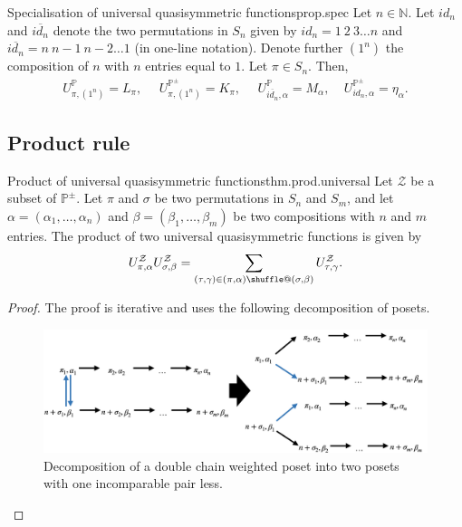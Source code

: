 \documentclass[numbers=enddot,12pt,final,onecolumn,notitlepage]{scrartcl}%
\makeatletter
\newcommand{\al}{\alpha}
\newcommand{\be}{\beta}
\newcommand{\NN}{\mathbb{N}} %
\newcommand{\PP}{\mathbb{P}} %
\providecommand*{\shuffle}{%
  \mathbin{\mathpalette\shuffle@{}}%
}
\newcommand*{\shuffle@}[2]{%
  \sbox0{$#1\vcenter{}$}%
  \kern .15\ht0 %
  \rlap{\vrule height .25\ht0 depth 0pt width 2.5\ht0}%
  \raise.1\ht0\hbox to 2.5\ht0{%
    \vrule height 1.75\ht0 depth -.1\ht0 width .17\ht0 %
    \hfill
    \vrule height 1.75\ht0 depth -.1\ht0 width .17\ht0 %
    \hfill
    \vrule height 1.75\ht0 depth -.1\ht0 width .17\ht0 %
  }%
  \kern .15\ht0 %
}
\newcommand{\0}{\phantom{c}}
\let\sumnonlimits\sum
\renewcommand{\sum}{\sumnonlimits\limits}
\makeatother
\begin{document}
\begin{proposition}{Specialisation of universal quasisymmetric functions}{prop.spec}
\indent Let $n \in \NN$. Let $id_{n}$ and $\overline{id_{n}}$ denote the two permutations in $S_n$ given by $id_{n} = 1~2~3\dots n$ and $\overline{id_{n}} = n~n-1~n-2\dots 1$ (in one-line notation). Denote further $(1^n)$ the composition of $n$ with $n$ entries equal to $1$. Let $\pi \in S_n$. Then,
\begin{align}
\label{eq : UE} U^\mathcal{\PP}_{\pi,(1^n)} = L_\pi, ~~~~~~U^\mathcal{\PP^\pm}_{\pi,(1^n)} = K_\pi, ~~~~~~U^{\mathcal{\PP}}_{\overline{id_{n}},\alpha} = M_{\alpha},
~~~~~U^{\mathcal{\PP^\pm}}_{id_{n},\alpha} = \eta_{\alpha}.
\end{align}

\end{proposition}

\subsection{Product rule}
\begin{theorem}{Product of universal quasisymmetric functions}{thm.prod.universal}
Let $\mathcal{Z}$ be a subset of $\PP^{\pm}$.
Let $\pi$ and $\sigma$ be two permutations in $S_n$ and $S_m$, and let $\alpha = (\al_1,\dots,\al_n)$ and $\beta = (\be_1,\dots,\be_m)$ be two compositions with $n$ and $m$ entries.
The product of two universal quasisymmetric functions is given by
\begin{equation}
\label{eq : UU}
U^\mathcal{Z}_{\pi,\alpha}U^\mathcal{Z}_{\sigma,\beta}=\sum_{(\tau,\gamma)\in(\pi,\alpha)\shuffle(\sigma,\beta)}U^\mathcal{Z}_{\tau,\gamma} .
\end{equation}
\end{theorem}
\begin{proof}
The proof is iterative and uses the following decomposition of posets.
%
\begin{figure}[htbp]
\begin{center}
 \includegraphics[scale=0.22]{PosetBij.png}\caption{Decomposition of a double chain weighted poset into two posets with one incomparable pair less.}
 \label{fig : prodmonomial}
 \end{center}
 \end{figure}
\end{proof}
\end{document}
